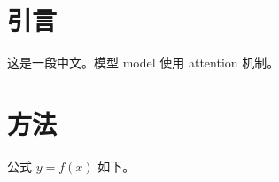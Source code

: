 \documentclass{ctexart}
\begin{document}
\section{引言}\label{sec:intro}
这是一段中文。模型 model 使用 attention 机制。

\section{方法}
公式 $y = f(x)$ 如下。
\end{document}
